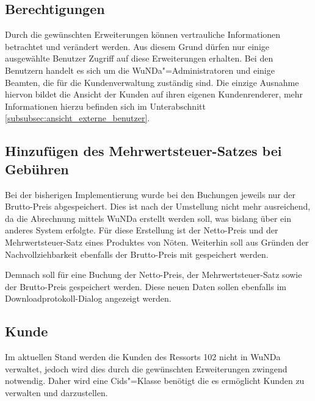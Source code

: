\subsection{Berechtigungen} \label{subsec:berechtigungen}
Durch die gewünschten Erweiterungen können vertrauliche Informationen betrachtet und verändert werden.
Aus diesem Grund dürfen nur einige ausgewählte Benutzer Zugriff auf diese Erweiterungen erhalten.
Bei den Benutzern handelt es sich um die \ac{WuNDa}"=Administratoren und einige Beamten, die für die Kundenverwaltung zuständig sind.
Die einzige Ausnahme hiervon bildet die Ansicht der Kunden auf ihren eigenen Kundenrenderer, mehr Informationen hierzu befinden sich im Unterabschnitt \autoref{subsubsec:ansicht_externe_benutzer}. 

\subsection{Hinzufügen des Mehrwertsteuer-Satzes bei Gebühren}
Bei der bisherigen Implementierung wurde bei den Buchungen jeweils nur der Brutto-Preis abgespeichert.
Dies ist nach der Umstellung nicht mehr ausreichend, da die Abrechnung mittels \ac{WuNDa} erstellt werden soll, was bislang über ein anderes System erfolgte.
Für diese Erstellung ist der Netto-Preis und der Mehrwertsteuer-Satz eines Produktes von Nöten. Weiterhin soll aus Gründen der Nachvollziehbarkeit ebenfalls der Brutto-Preis mit gespeichert werden.

Demnach soll für eine Buchung der Netto-Preis, der Mehrwertsteuer-Satz sowie der Brutto-Preis gespeichert werden. Diese neuen Daten sollen ebenfalls im Downloadprotokoll-Dialog angezeigt werden.
\subsection{Kunde}
Im aktuellen Stand werden die Kunden des Ressorts 102 nicht in \ac{WuNDa} verwaltet, jedoch wird dies durch die gewünschten Erweiterungen zwingend notwendig.
Daher wird eine Cids"=Klasse benötigt die es ermöglicht Kunden zu verwalten und darzustellen. 

